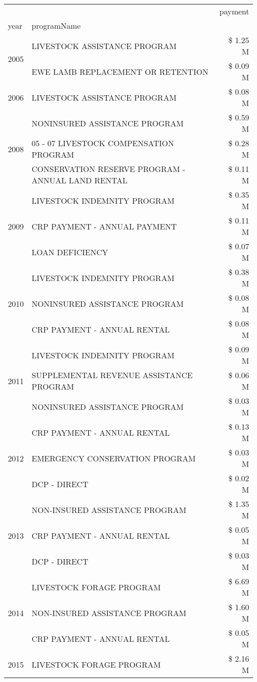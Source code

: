 \begin{tabular}{llr}
\toprule
 &  & payment \\
year & programName &  \\
\midrule
\multirow[t]{2}{*}{2005} & LIVESTOCK ASSISTANCE PROGRAM & \$ 1.25 M \\
 & EWE LAMB REPLACEMENT OR RETENTION & \$ 0.09 M \\
\cline{1-3}
2006 & LIVESTOCK ASSISTANCE PROGRAM & \$ 0.08 M \\
\cline{1-3}
\multirow[t]{3}{*}{2008} & NONINSURED ASSISTANCE PROGRAM & \$ 0.59 M \\
 & 05 - 07 LIVESTOCK COMPENSATION PROGRAM & \$ 0.28 M \\
 & CONSERVATION RESERVE PROGRAM - ANNUAL LAND RENTAL & \$ 0.11 M \\
\cline{1-3}
\multirow[t]{3}{*}{2009} & LIVESTOCK INDEMNITY PROGRAM & \$ 0.35 M \\
 & CRP PAYMENT - ANNUAL PAYMENT & \$ 0.11 M \\
 & LOAN DEFICIENCY & \$ 0.07 M \\
\cline{1-3}
\multirow[t]{3}{*}{2010} & LIVESTOCK INDEMNITY PROGRAM & \$ 0.38 M \\
 & NONINSURED ASSISTANCE PROGRAM & \$ 0.08 M \\
 & CRP PAYMENT - ANNUAL RENTAL & \$ 0.08 M \\
\cline{1-3}
\multirow[t]{3}{*}{2011} & LIVESTOCK INDEMNITY PROGRAM & \$ 0.09 M \\
 & SUPPLEMENTAL REVENUE ASSISTANCE PROGRAM & \$ 0.06 M \\
 & NONINSURED ASSISTANCE PROGRAM & \$ 0.03 M \\
\cline{1-3}
\multirow[t]{3}{*}{2012} & CRP PAYMENT - ANNUAL RENTAL & \$ 0.13 M \\
 & EMERGENCY CONSERVATION PROGRAM & \$ 0.03 M \\
 & DCP - DIRECT & \$ 0.02 M \\
\cline{1-3}
\multirow[t]{3}{*}{2013} & NON-INSURED ASSISTANCE PROGRAM & \$ 1.35 M \\
 & CRP PAYMENT - ANNUAL RENTAL & \$ 0.05 M \\
 & DCP - DIRECT & \$ 0.03 M \\
\cline{1-3}
\multirow[t]{3}{*}{2014} & LIVESTOCK FORAGE PROGRAM & \$ 6.69 M \\
 & NON-INSURED ASSISTANCE PROGRAM & \$ 1.60 M \\
 & CRP PAYMENT - ANNUAL RENTAL & \$ 0.05 M \\
\cline{1-3}
\multirow[t]{3}{*}{2015} & LIVESTOCK FORAGE PROGRAM & \$ 2.16 M \\

\end{tabular}
